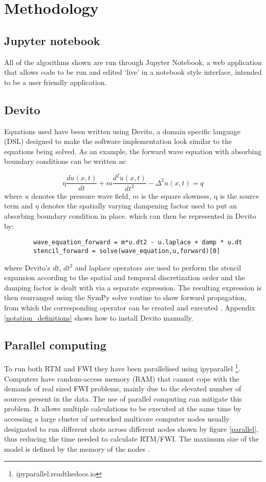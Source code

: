 \chapter{Methodology}
\label{methodology}

\section{Jupyter notebook}
All of the algorithms shown are run through Jupyter Notebook, a web application that allows code to be run and edited `live' in a notebook style interface, intended to be a user friendly application. 

\section{Devito}
Equations used have been written using Devito, a domain specific language (DSL) designed to make the software implementation look similar to the equations being solved. As an example, the forward wave equation with absorbing boundary conditions can be written as: 

\begin{equation}
\eta \frac{du(x,t)}{dt} + m \frac{d^{2}u(x,t)}{dt^{2}} - \Delta^{2} u(x,t) = q
\end{equation}
where $u$ denotes the pressure wave field, $m$ is the square slowness, q is the source term and $\eta$  denotes the spatially varying dampening factor used to put an absorbing boundary condition in place. 
which can then be represented in Devito by:

\begin{verbatim}
		wave_equation_forward = m*u.dt2 - u.laplace + damp * u.dt
		stencil_forward = solve(wave_equation,u,forward)[0]
\end{verbatim}

where Devito's $dt$, $dt^{2}$ and laplace operators are used to perform the stencil expansion
according to the spatial and temporal discretization order and the damping factor is dealt with via a separate expression. The resulting expression is then rearranged using the SymPy solve routine to show forward propagation, from which the corresponding operator can be created and executed \citep{lange2016devito}. 
Appendix \ref{notation_definitions} shows how to install Devito manually. 

\section{Parallel computing}
To run both RTM and FWI they have been parallelised using ipyparallel \footnote{ipyparallel.readthedocs.io}. Computers have random-access memory (RAM) that cannot cope with the demands of real sized FWI problems, mainly due to the elevated number of sources present in the data. The use of parallel computing can mitigate this problem. It allows multiple calculations to be executed at the same time by accessing a large cluster of networked multicore computer nodes usually designated to run different shots across different nodes shown by figure \ref{parallel}, thus reducing the time needed to calculate RTM/FWI. The maximum size of the model is defined by the memory of the nodes \citep{podvin1991finite}. 

